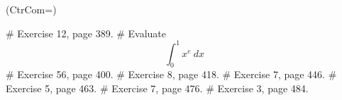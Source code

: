\documentclass[11pt]{book}
\begin{document}
\thispagestyle{fancy}
\vspace{0.3in}
\begin{easylist}
\ListProperties(CtrCom=\fbox)


# Exercise 12, page 389.
\vspace{0.2in}
# Evaluate \[
\int_0^1 x^e~dx
\]
\vspace{0.2in}
# Exercise 56, page 400.
\vspace{0.2in}
# Exercise 8, page 418.
\vspace{0.2in}  
# Exercise 7, page 446.
\vspace{0.2in}
# Exercise 5, page 463.
\vspace{0.2in}
# Exercise 7, page 476.
\vspace{0.2in}
# Exercise 3, page 484.

 \end{easylist}
\end{document}
